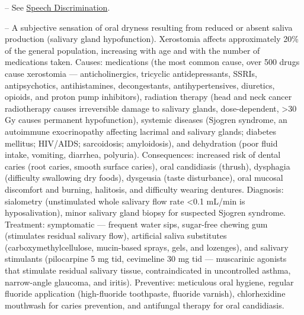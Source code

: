-- See \hyperlink{Speech Discrimination}{Speech Discrimination}.

-- A subjective sensation of oral dryness resulting from reduced or absent saliva production (salivary gland hypofunction). Xerostomia affects approximately 20\% of the general population, increasing with age and with the number of medications taken. Causes: medications (the most common cause, over 500 drugs cause xerostomia — anticholinergics, tricyclic antidepressants, SSRIs, antipsychotics, antihistamines, decongestants, antihypertensives, diuretics, opioids, and proton pump inhibitors), radiation therapy (head and neck cancer radiotherapy causes irreversible damage to salivary glands, dose-dependent, >30 Gy causes permanent hypofunction), systemic diseases (Sjogren syndrome, an autoimmune exocrinopathy affecting lacrimal and salivary glands; diabetes mellitus; HIV/AIDS; sarcoidosis; amyloidosis), and dehydration (poor fluid intake, vomiting, diarrhea, polyuria). Consequences: increased risk of dental caries (root caries, smooth surface caries), oral candidiasis (thrush), dysphagia (difficulty swallowing dry foods), dysgeusia (taste disturbance), oral mucosal discomfort and burning, halitosis, and difficulty wearing dentures. Diagnosis: sialometry (unstimulated whole salivary flow rate <0.1 mL/min is hyposalivation), minor salivary gland biopsy for suspected Sjogren syndrome. Treatment: symptomatic — frequent water sips, sugar-free chewing gum (stimulates residual salivary flow), artificial saliva substitutes (carboxymethylcellulose, mucin-based sprays, gels, and lozenges), and salivary stimulants (pilocarpine 5 mg tid, cevimeline 30 mg tid — muscarinic agonists that stimulate residual salivary tissue, contraindicated in uncontrolled asthma, narrow-angle glaucoma, and iritis). Preventive: meticulous oral hygiene, regular fluoride application (high-fluoride toothpaste, fluoride varnish), chlorhexidine mouthwash for caries prevention, and antifungal therapy for oral candidiasis.
